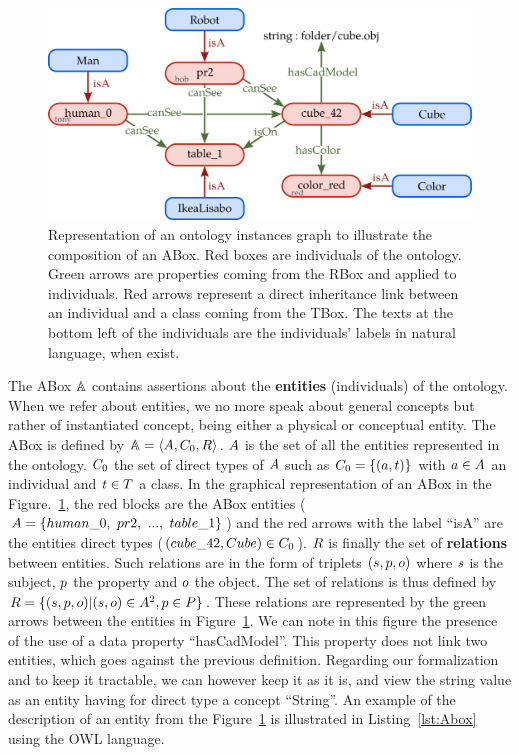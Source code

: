\begin{figure}[ht!]
\centering
\includegraphics[scale=0.4]{figures/chapter2/Abox.png}
\caption{\label{fig:Abox}  Representation of an ontology instances graph to illustrate the composition of an ABox. Red boxes are individuals of the ontology. Green arrows are properties coming from the RBox and applied to individuals. Red arrows represent a direct inheritance link between an individual and a class coming from the TBox. The texts at the bottom left of the individuals are the individuals' labels in natural language, when exist.}
\end{figure}

The ABox $\mathbb{A}$ contains assertions about the \textbf{entities} (individuals) of the ontology. When we refer about entities, we no more speak about general concepts but rather of instantiated concept, being either a physical or conceptual entity. The ABox is defined by $\mathbb{A} = \langle A, C_0, R \rangle$. $A$ is the set of all the entities represented in the ontology. $C_0$ the set of direct types of $A$ such as $C_0 = \{(a, t) \}$ with $a \in A$ an individual and $t \in T$ a class. In the graphical representation of an ABox in the Figure.~\ref{fig:Abox}, the red blocks are the ABox entities ($\indivset = \{human\_0,\ pr2,\ ...,\ table\_1\}$) and the red arrows with the label ``isA'' are the entities direct types ($(cube\_42, Cube) \in C_0$).
$R$ is finally the set of \textbf{relations} between entities. Such relations are in the form of triplets $(s, p ,o)$ where $s$ is the subject, $p$ the property and $o$ the object. The set of relations is thus defined by $R = \{(s, p ,o) | (s, o) \in A^2, p \in P\}$. These relations are represented by the green arrows between the entities in Figure~\ref{fig:Abox}. We can note in this figure the presence of the use of a data property ``hasCadModel''. This property does not link two entities, which goes against the previous definition. Regarding our formalization and to keep it tractable, we can however keep it as it is, and view the string value as an entity having for direct type a concept ``String''. An example of the description of an entity from the Figure~\ref{fig:Abox} is illustrated in Listing~\ref{lst:Abox} using the OWL language.

